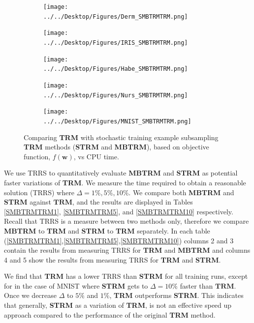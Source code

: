 \documentclass[letterpaper,12pt,titlepage,oneside,final]{book}
\begin{document}
	\begin{figure}
		\centering
		\begin{subfigure}{.45\textwidth}
			\texttt{[image: ../../Desktop/Figures/Derm\_SMBTRMTRM.png]}
		\end{subfigure}%
		\begin{subfigure}{.45\textwidth}
			\texttt{[image: ../../Desktop/Figures/IRIS\_SMBTRMTRM.png]}
		\end{subfigure}
		\begin{subfigure}{.45\textwidth}
			\texttt{[image: ../../Desktop/Figures/Habe\_SMBTRMTRM.png]}
		\end{subfigure}
		\begin{subfigure}{.45\textwidth}
			\texttt{[image: ../../Desktop/Figures/Nurs\_SMBTRMTRM.png]}
		\end{subfigure}
		\begin{subfigure}{.45\textwidth}
			\texttt{[image: ../../Desktop/Figures/MNIST\_SMBTRMTRM.png]}
		\end{subfigure}
		\caption{Comparing \textbf{TRM} with stochastic training example subsampling \textbf{TRM} methods (\textbf{STRM} and \textbf{MBTRM}), based on objective function, $f(\mathbf{w})$, vs CPU time.}
		\label{figure:SMBTRMTRM}
	\end{figure}
	
	
	We use TRRS to quantitatively evaluate \textbf{MBTRM} and \textbf{STRM} as potential faster variations of \textbf{TRM}. We measure the time required to obtain a reasonable solution (TRRS) where $\Delta = 1\%, 5\%, 10\%$. We compare both \textbf{MBTRM} and \textbf{STRM} against $\mathbf{TRM}$, and the results are displayed in Tables \ref{SMBTRMTRM1}, \ref{SMBTRMTRM5}, and \ref{SMBTRMTRM10} respectively. Recall that TRRS is a measure between two methods only, therefore we compare \textbf{MBTRM} to \textbf{TRM} and \textbf{STRM} to \textbf{TRM} separately. In each table (\ref{SMBTRMTRM1},\ref{SMBTRMTRM5},\ref{SMBTRMTRM10}) columns 2 and 3 contain the results from measuring TRRS for \textbf{TRM} and \textbf{MBTRM} and columns 4 and 5 show the results from measuring TRRS for \textbf{TRM} and \textbf{STRM}.
	
	We find that \textbf{TRM} has a lower TRRS than \textbf{STRM} for all training runs, except for in the case of MNIST where \textbf{STRM} gets to $\Delta = 10\%$ faster than $\textbf{TRM}$. Once we decrease $\Delta$ to $5\%$ and $1\%$, \textbf{TRM} outperforms \textbf{STRM}. This indicates that generally, \textbf{STRM} as a variation of \textbf{TRM}, is not an effective speed up approach compared to the performance of the original \textbf{TRM} method.
	
\end{document}
